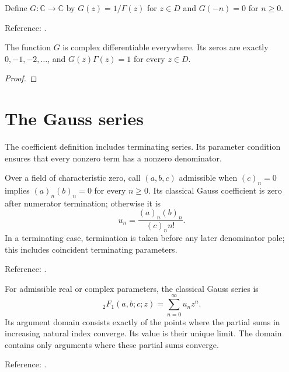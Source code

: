 \begin{definition}
\label{def:reciprocal-gamma}
\leanok
Define $G:\mathbb C\to\mathbb C$ by $G(z)=1/\Gamma(z)$ for $z\in D$ and
$G(-n)=0$ for $n\ge0$.

Reference: \cite[5.2(i)]{dlmf}.
\end{definition}

\begin{theorem}
\label{thm:reciprocal-gamma}
\leanok
The function $G$ is complex differentiable everywhere. Its zeros are exactly
$0,-1,-2,\ldots$, and $G(z)\Gamma(z)=1$ for every $z\in D$.
\end{theorem}
\begin{proof}
\leanok
\end{proof}

\section{The Gauss series}\label{sec:textbook-special-functions-gauss}

The coefficient definition includes terminating series. Its parameter condition ensures that every nonzero term has a nonzero denominator.

\begin{definition}
\label{def:gauss-coefficients}
\leanok
Over a field of characteristic zero, call $(a,b,c)$ admissible when
$(c)_n=0$ implies $(a)_n(b)_n=0$ for every $n\ge0$. Its classical Gauss
coefficient is zero after numerator termination; otherwise it is
\[
 u_n=\frac{(a)_n(b)_n}{(c)_n n!}.
\]
 In a terminating case,
termination is taken before any later denominator pole; this includes coincident
terminating parameters.

Reference: \cite[15.2.1, 15.2.4--15.2.6]{dlmf}.
\end{definition}

\begin{definition}
\label{def:ordinary-hypergeometric}
\leanok
For admissible real or complex parameters, the classical Gauss series is
\[{}_2F_1(a,b;c;z)=\sum_{n=0}^{\infty}u_n z^n.\]
Its argument domain consists exactly of the points where the partial sums in
increasing natural index converge. Its value is their unique limit.  The domain contains only arguments where these partial sums converge.

Reference: \cite[15.2.1, 15.2.4--15.2.5]{dlmf}.
\end{definition}

